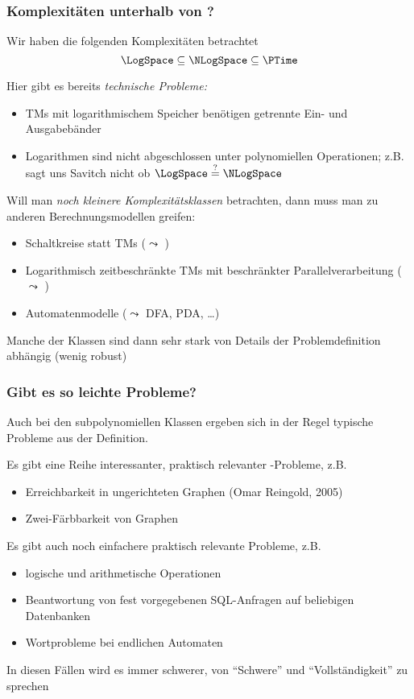 \documentclass[aspectratio=1610,onlymath]{beamer}
\begin{document}
\begin{frame}\frametitle{Komplexitäten unterhalb von \PTime?}

Wir haben die folgenden Komplexitäten betrachtet
\[\LogSpace \subseteq \NLogSpace \subseteq \PTime\]

Hier gibt es bereits \emph{technische Probleme:}
\begin{itemize}
\item TMs mit logarithmischem Speicher benötigen getrennte Ein- und Ausgabebänder
\item Logarithmen sind nicht abgeschlossen unter polynomiellen Operationen;
z.B. sagt uns Savitch \alert{nicht} ob $\LogSpace \stackrel{?}{=} \NLogSpace$
\end{itemize}\pause\smallskip

Will man \emph{noch kleinere Komplexitätsklassen} betrachten, dann muss man zu anderen
Berechnungsmodellen greifen:
\begin{itemize}
\item Schaltkreise statt TMs ($\leadsto$ )
\item Logarithmisch zeitbeschränkte TMs mit beschränkter Parallelverarbeitung ($\leadsto$ )
\item Automatenmodelle ($\leadsto$ DFA, PDA, \ldots)
\end{itemize}
Manche der Klassen sind dann sehr stark von Details der Problemdefinition
abhängig (wenig robust)

\end{frame}

\begin{frame}\frametitle{Gibt es so leichte Probleme?}

Auch bei den subpolynomiellen Klassen ergeben sich in der Regel typische Probleme
aus der Definition.
\bigskip\pause

Es gibt eine Reihe \alert{interessanter, praktisch relevanter \LogSpace-Probleme}, z.B.
\begin{itemize}
\item Erreichbarkeit in ungerichteten Graphen (Omar Reingold, 2005)
\item Zwei-Färbbarkeit von Graphen
\end{itemize}
\bigskip\pause

Es gibt auch \alert{noch einfachere praktisch relevante Probleme}, z.B.
\begin{itemize}
\item logische und arithmetische Operationen
\item Beantwortung von fest vorgegebenen SQL-Anfragen auf beliebigen Datenbanken
\item Wortprobleme bei endlichen Automaten
\end{itemize}

In diesen Fällen wird es immer schwerer, von "`Schwere"' und "`Vollständigkeit"' zu sprechen

\end{frame}
\end{document}
